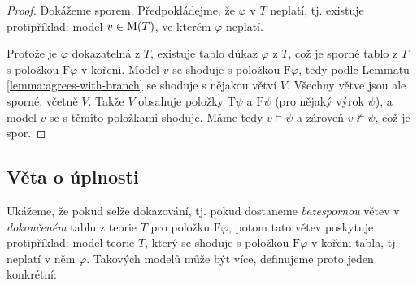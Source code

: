 \begin{proof}
Dokážeme sporem. Předpokládejme, že $\varphi$ v $T$ neplatí, tj. existuje protipříklad: model $v\in\operatorname{M}(T)$, ve kterém $\varphi$ neplatí.

Protože je $\varphi$ dokazatelná z $T$, existuje tablo důkaz $\varphi$ z $T$, což je sporné tablo z $T$ s položkou $\mathrm{F}\varphi$ v kořeni. Model $v$ se shoduje s položkou $\mathrm{F}\varphi$, tedy podle Lemmatu \ref{lemma:agrees-with-branch} se shoduje s nějakou větví $V$. Všechny větve jsou ale sporné, včetně $V$. Takže $V$ obsahuje položky $\mathrm{T}\psi$ a $\mathrm{F}\psi$ (pro nějaký výrok $\psi$), a model $v$ se s těmito položkami shoduje. Máme tedy $v\models\psi$ a zároveň $v\not\models\psi$, což je spor.

\end{proof}

\subsection{Věta o úplnosti}

Ukážeme, že pokud selže dokazování, tj. pokud dostaneme \emph{bezespornou} větev v \emph{dokončeném} tablu z teorie $T$ pro položku $\mathrm{F}\varphi$, potom tato větev poskytuje protipříklad: model teorie $T$, který se shoduje s položkou $\mathrm{F}\varphi$ v kořeni tabla, tj. neplatí v něm $\varphi$. Takových modelů může být více, definujeme proto jeden konkrétní:


